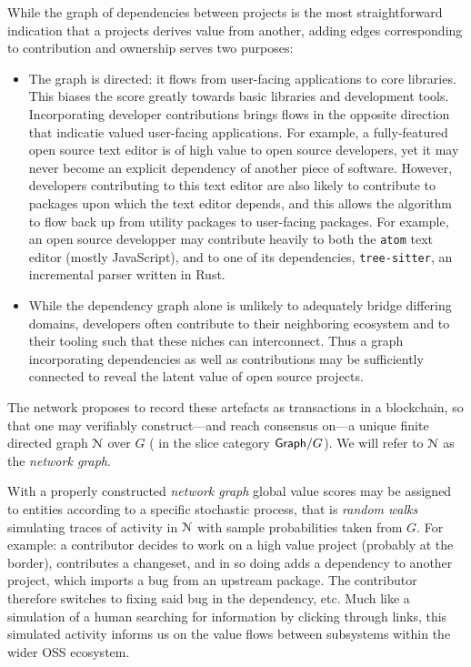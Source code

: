 

While the graph of dependencies between projects is the most straightforward
indication that a projects derives value from another, adding edges corresponding
to contribution and ownership serves two purposes:
\begin{itemize}
\item The graph is directed: it flows from user-facing applications to core
  libraries. This biases the score greatly towards basic libraries and
  development tools. Incorporating developer contributions brings flows in the
  opposite direction that indicatie valued user-facing applications. For example,
  a fully-featured open source text editor is of high value to
  open source developers, yet it may never become an explicit dependency of another
  piece of software. However, developers contributing to this text editor are
  also likely to contribute to packages upon which the text editor depends, and this
  allows the algorithm to flow back up from utility packages to user-facing
  packages. For example, an open source developper may contribute
  heavily to both the \texttt{atom} text editor (mostly JavaScript), and to
  one of its dependencies, \texttt{tree-sitter}, an incremental parser written
  in Rust.
\item While the dependency graph alone is unlikely to adequately bridge
  differing domains, developers often contribute to their neighboring ecosystem and
  to their tooling such that these niches can interconnect. Thus a graph incorporating
  dependencies as well as contributions may be sufficiently connected to
  reveal the latent value of open source projects.
\end{itemize}


The \oscoin{} network proposes to record these artefacts as
transactions in a blockchain, so that one may verifiably construct---and
reach consensus on---a unique finite directed graph $\mathcal{N}$ over $G$
(\ie{} in the slice category $\mathsf{Graph}/G$). We will refer to $\mathcal{N}$
as the \emph{network graph}.

With a properly constructed \emph{network graph} global value scores may be
assigned to entities according to a specific stochastic process, that is
\emph{random walks} simulating traces of activity in $\mathcal{N}$ with sample
probabilities taken from $G$. For example: a contributor decides to
work on a high value project (probably at the border), contributes a
changeset, and in so doing adds a dependency to another project, which imports a
bug from an upstream package. The contributor therefore switches to fixing said
bug in the dependency, etc. Much like a simulation of a human
searching for information by clicking through links, this simulated activity
informs us on the value flows between subsystems within the wider OSS
ecosystem.

